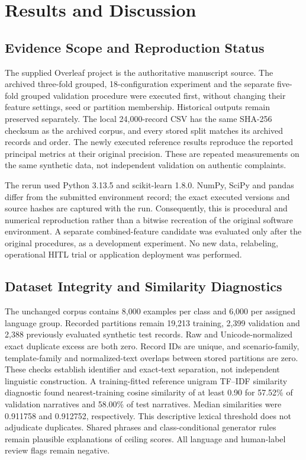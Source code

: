\chapter{Results and Discussion}
\section{Evidence Scope and Reproduction Status}
The supplied Overleaf project is the authoritative manuscript source. The archived three-fold grouped, 18-configuration experiment and the separate five-fold grouped validation procedure were executed first, without changing their feature settings, seed or partition membership. Historical outputs remain preserved separately. The local 24,000-record CSV has the same SHA-256 checksum as the archived corpus, and every stored split matches its archived records and order. The newly executed reference results reproduce the reported principal metrics at their original precision. These are repeated measurements on the same synthetic data, not independent validation on authentic complaints.

The rerun used Python 3.13.5 and scikit-learn 1.8.0. NumPy, SciPy and pandas differ from the submitted environment record; the exact executed versions and source hashes are captured with the run. Consequently, this is procedural and numerical reproduction rather than a bitwise recreation of the original software environment. A separate combined-feature candidate was evaluated only after the original procedures, as a development experiment. No new data, relabeling, operational HITL trial or application deployment was performed.

\section{Dataset Integrity and Similarity Diagnostics}
The unchanged corpus contains 8,000 examples per class and 6,000 per assigned language group. Recorded partitions remain 19,213 training, 2,399 validation and 2,388 previously evaluated synthetic test records. Raw and Unicode-normalized exact duplicate excess are both zero. Record IDs are unique, and scenario-family, template-family and normalized-text overlaps between stored partitions are zero. These checks establish identifier and exact-text separation, not independent linguistic construction.
A training-fitted reference unigram TF--IDF similarity diagnostic found nearest-training cosine similarity of at least 0.90 for 57.52\% of validation narratives and 58.00\% of test narratives. Median similarities were 0.911758 and 0.912752, respectively. This descriptive lexical threshold does not adjudicate duplicates. Shared phrases and class-conditional generator rules remain plausible explanations of ceiling scores. All language and human-label review flags remain negative.

